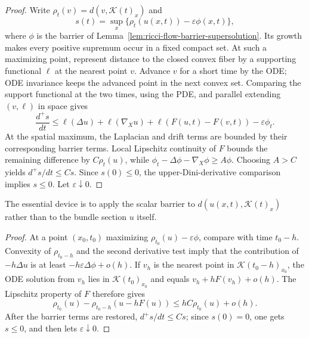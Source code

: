 \begin{proof}
\sketch
{}
Write $\rho_t(v)=d(v,\mathcal K(t)_x)$ and
\[
s(t)=\sup_x\{\rho_t(u(x,t))-\varepsilon\phi(x,t)\},
\]
where $\phi$ is the barrier of
Lemma~\ref{lem:ricci-flow-barrier-supersolution}.  Its growth makes every
positive supremum occur in a fixed compact set.  At such a maximizing point,
represent distance to the closed convex fiber by a supporting functional
$\ell$ at the nearest point $v$.  Advance $v$ for a short time by the ODE;
ODE invariance keeps the advanced point in the next convex set.  Comparing
the support functional at the two times, using the PDE, and parallel
extending $(v,\ell)$ in space gives
\[
\frac{d^+s}{dt}\leq
\ell(\Delta u)+\ell(\nabla_Xu)+
\ell(F(u,t)-F(v,t))-\varepsilon\phi_t.
\]
At the spatial maximum, the Laplacian and drift terms are bounded by their
corresponding barrier terms.  Local Lipschitz continuity of $F$ bounds the
remaining difference by $C\rho_t(u)$, while
$\phi_t-\Delta\phi-\nabla_X\phi\geq A\phi$.  Choosing $A>C$ yields
$d^+s/dt\leq Cs$.  Since $s(0)\leq0$, the upper-Dini-derivative comparison
implies $s\leq0$.  Let $\varepsilon\downarrow0$.
\end{proof}

\begin{remark}
\label{rem:barrier-applied-to-distance-from-convex-set}


The essential device is to apply the scalar barrier to
$d(u(x,t),\mathcal K(t)_x)$ rather than to the bundle section $u$ itself.
\end{remark}

\begin{proof}
\sketch
{}
At a point $(x_0,t_0)$ maximizing
$\rho_{t_0}(u)-\varepsilon\phi$, compare with time $t_0-h$.  Convexity of
$\rho_{t_0-h}$ and the second derivative test imply that the contribution of
$-h\Delta u$ is at least $-h\varepsilon\Delta\phi+o(h)$.  If $v_h$ is the
nearest point in $\mathcal K(t_0-h)_{x_0}$, the ODE solution from $v_h$ lies
in $\mathcal K(t_0)_{x_0}$ and equals $v_h+hF(v_h)+o(h)$.  The Lipschitz
property of $F$ therefore gives
\[
\rho_{t_0}(u)-\rho_{t_0-h}(u-hF(u))
\leq hC\rho_{t_0}(u)+o(h).
\]
After the barrier terms are restored, $d^+s/dt\leq Cs$; since $s(0)=0$, one
gets $s\leq0$, and then lets $\varepsilon\downarrow0$.
\end{proof}

